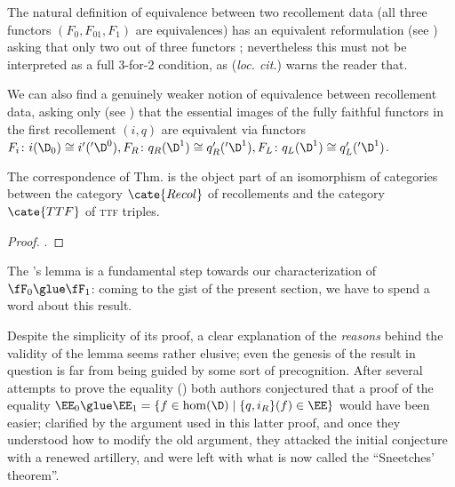 \begin{remark}
The natural definition of equivalence between two recollement data (all three functors $(F_0, F_{01}, F_1)$ are equivalences) has an equivalent reformulation (see \cite[ \textbf{2.5}]{parshall1988derived}) asking that only two out of three functors ; nevertheless this must not be interpreted as a full 3-for-2 condition, as (\emph{loc. cit.}) warns the reader that.

We can also find a genuinely weaker notion of equivalence between recollement data, asking only (see \cite[\S \textbf{1.7}]{hugel2011recollements}) that the essential images of the fully faithful functors in the first recollement $(i,q)$ are equivalent via functors $F_i\colon i(\D_0)\cong i'('{\D^0}), F_R\colon q_R(\D^1) \cong q_R'('{\D^1}), F_L \colon q_L(\D^1) \cong q_L'('{\D^1})$.
\end{remark}
\begin{proposition}
The correspondence of Thm.  is the object part of an isomorphism of categories between the category $\cate{Recol}$ of recollements and the category $\cate{TTF}$ of \textsc{ttf} triples.
\end{proposition}
\begin{proof}
.
\end{proof}
\hrulefill

\begin{remark}
The \ror's lemma is a fundamental step towards our characterization of $\fF_0\glue \fF_1$: coming to the gist of the present section, we have to spend a word about this result.

Despite the simplicity of its proof, a clear explanation of the \emph{reasons} behind the validity of the \ror lemma seems rather elusive; even the genesis of the result in question is far from being guided by some sort of precognition. After several attempts to prove the equality () both authors conjectured that a proof of the equality $\EE_0\glue \EE_1=\{f\in\hom(\D)\mid \{q, i_R\}(f)\in \EE\}$ would have been easier; clarified by the argument used in this latter proof, and once they understood how to modify the old argument, they attacked the initial conjecture with a renewed artillery, and were left with what is now called the ``Sneetches' theorem''.
\end{remark}

